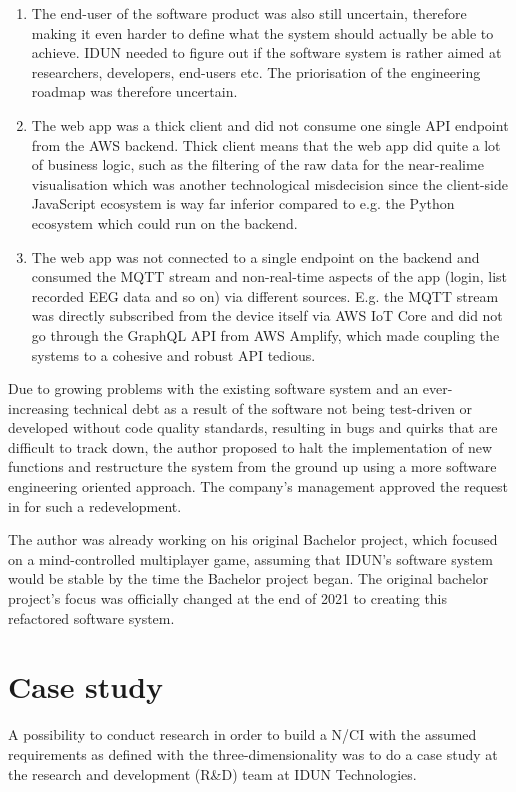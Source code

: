 \begin{enumerate}
   \item The end-user of the software product was also still uncertain, therefore making it even harder to define what the system should actually be able to achieve. IDUN needed to figure out if the software system is rather aimed at researchers, developers, end-users etc. The priorisation of the engineering roadmap was therefore uncertain.
   \item The web app was a thick client and did not consume one single API endpoint from the AWS backend. Thick client means that the web app did quite a lot of business logic, such as the filtering of the raw data for the near-realime visualisation which was another technological misdecision since the client-side JavaScript ecosystem is way far inferior compared to e.g. the Python ecosystem which could run on the backend.
   \item The web app was not connected to a single endpoint on the backend and consumed the MQTT stream and non-real-time aspects of the app (login, list recorded EEG data and so on) via different sources. E.g. the MQTT stream was directly subscribed from the device itself via AWS IoT Core and did not go through the GraphQL API from AWS Amplify, which made coupling the systems to a cohesive and robust API tedious. 
\end{enumerate}

Due to growing problems with the existing software system and an ever-increasing technical debt as a result of the software not being test-driven or developed without code quality standards, resulting in bugs and quirks that are difficult to track down, the author proposed to halt the implementation of new functions and restructure the system from the ground up using a more software engineering oriented approach. The company's management approved the request in for such a redevelopment.

The author was already working on his original Bachelor project, which focused on a mind-controlled multiplayer game, assuming that IDUN's software system would be stable by the time the Bachelor project began. The original bachelor project's focus was officially changed at the end of 2021 to creating this refactored software system.

\section{Case study}
\label{chapter3-case-study}

A possibility to conduct research in order to build a N/CI with the assumed requirements as defined with the three-dimensionality was to do a case study at the research and development (R\&D) team at IDUN Technologies. 

